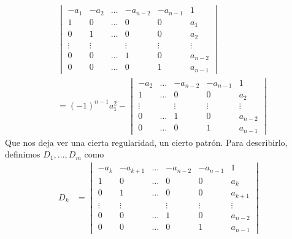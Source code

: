 \documentclass{report}
\theoremstyle{definition}
\theoremstyle{remark}
\begin{document}
  \begin{align}
    &\begin{vmatrix}
      - a_1
      &- a_2
      &\dots
      &- a_{n - 2}
      &- a_{n - 1}
      &1
      \\
      1
      &0
      &\dots
      &0
      &0
      &a_1
      \\
      0
      &1
      &\dots
      &0
      &0
      &a_2
      \\
      \vdots
      &\vdots
      &
      &\vdots
      &\vdots
      &\vdots
      \\
      0
      &0
      &\dots
      &1
      &0
      &a_{n - 2}
      \\
      0
      &0
      &\dots
      &0
      &1
      &a_{n - 1}
    \end{vmatrix}
    \\
    &=
    (- 1)^{n - 1} a_1^2
    -
    \begin{vmatrix}
      - a_2
      &\dots
      &- a_{n - 2}
      &- a_{n - 1}
      &1
      \\
      1
      &\dots
      &0
      &0
      &a_2
      \\
      \vdots
      &
      &\vdots
      &\vdots
      &\vdots
      \\
      0
      &\dots
      &1
      &0
      &a_{n - 2}
      \\
      0
      &\dots
      &0
      &1
      &a_{n - 1}
    \end{vmatrix}
  \end{align}
  Que nos deja ver una cierta regularidad, un cierto patrón.
  Para describirlo, definimos \(D_1, \dots, D_m\) como
  \begin{align}
    D_k
    &=
    \begin{vmatrix}
      - a_k
      &- a_{k + 1}
      &\dots
      &- a_{n - 2}
      &- a_{n - 1}
      &1
      \\
      1
      &0
      &\dots
      &0
      &0
      &a_k
      \\
      0
      &1
      &\dots
      &0
      &0
      &a_{k + 1}
      \\
      \vdots
      &\vdots
      &
      &\vdots
      &\vdots
      &\vdots
      \\
      0
      &0
      &\dots
      &1
      &0
      &a_{n - 2}
      \\
      0
      &0
      &\dots
      &0
      &1
      &a_{n - 1}
    \end{vmatrix}
  \end{align}
\end{document}
